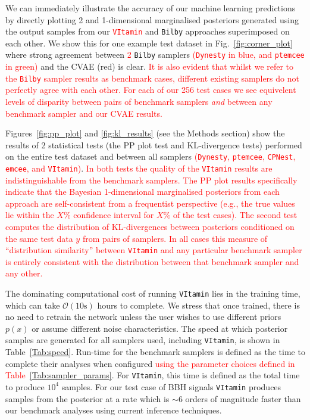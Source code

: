 \documentclass[%
showpacs,
nofootinbib,
 amsmath,amssymb,
 aps,
 twocolumn,
 prl,
 reprint,
floatfix,
]{revtex4-1}
\newcommand{\new}[1]{\textcolor{red}{#1}}
\begin{document}
%
%
We can immediately illustrate the accuracy of our machine learning predictions
by directly plotting 2 and 1-dimensional marginalised posteriors generated
using the output samples from our \new{\texttt{VItamin}} and \texttt{Bilby}
approaches superimposed on each other. We show this for one example test
dataset in Fig.~\ref{fig:corner_plot} where strong agreement between \new{2}
\texttt{Bilby} samplers \new{(\texttt{Dynesty} in blue, and \texttt{ptemcee} in green)} and the
\ac{CVAE} (red) is clear. \new{It is also evident that whilst we refer to the
\texttt{Bilby} sampler results as benchmark cases, different existing samplers
do not perfectly agree with each other. For each of our 256 test cases we see
equivelent levels of disparity between pairs of benchmark samplers \emph{and}
between any benchmark sampler and our \ac{CVAE} results.}  

%
%
Figures~\ref{fig:pp_plot} and \ref{fig:kl_results} (see the Methods section)
show the results of 2 statistical tests (the \ac{PP} plot test and
\ac{KL}-divergence tests) performed on the entire test dataset and between all
samplers \new{(\texttt{Dynesty}, \texttt{ptemcee}, \texttt{CPNest}, \texttt{emcee}, and \texttt{VItamin})}. \new{In
both tests the quality of the \new{\texttt{VItamin}} results are indistinguishable from the
benchmark samplers. The \ac{PP} plot results specifically indicate that the
Bayesian 1-dimensional marginalised posteriors from each approach are
self-consistent from a frequentist perspective (e.g., the true values lie
within the $X\%$ confidence interval for $X\%$ of the test cases). The second
test computes the distribution of \ac{KL}-divergences between posteriors
conditioned on the same test data $y$ from pairs of samplers. In all cases this
measure of ``distribution similarity'' between \texttt{VItamin} and any particular
benchmark sampler is entirely consistent with the distribution between that
benchmark sampler and any other.}   

%
%
The dominating computational cost of running \texttt{VItamin} lies in the
training time, which can take $\mathcal{O}(10\text{s})$ hours to complete. We
stress that once trained, there is no need to retrain the network unless the
user wishes to use different priors $p(x)$ or assume different noise
characteristics. The speed at which posterior samples are generated for all
samplers used, including \texttt{VItamin}, is shown in Table~\ref{Tab:speed}.
Run-time for the benchmark samplers is defined as the time to complete their
analyses when configured \new{using the parameter choices defined in
Table~\ref{Tab:sampler_params}}. For \texttt{VItamin}, this time is defined as
the total time to produce $10^4$ samples. For our test case of \ac{BBH} signals
\texttt{VItamin} produces samples from the posterior at a rate which is $\sim
6$ orders of magnitude faster than our benchmark analyses using current
inference techniques. 
\end{document}
